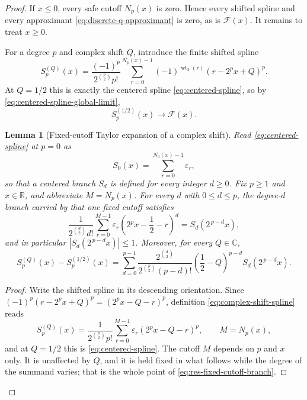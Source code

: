 \documentclass[11pt,oneside]{article}
\newtheorem{lemma}[theorem]{Lemma}
\theoremstyle{definition}
\theoremstyle{remark}
\newcommand{\R}{\mathbb R}
\newcommand{\C}{\mathbb C}
\newcommand{\wt}{\operatorname{wt}_2}
\begin{document}
\begin{proof}
If $x\le0$, every safe cutoff $N_p(x)$ is zero.  Hence every shifted spline and every
approximant \eqref{eq:discrete-q-approximant} is zero, as is $\mathcal F(x)$.  It remains
to treat $x\ge0$.

For a degree $p$ and complex shift $Q$, introduce the finite shifted spline
\begin{equation}
 S_p^{(Q)}(x)=
 \frac{(-1)^p}{2^{\binom p2}p!}
 \sum_{r=0}^{N_p(x)-1}(-1)^{\wt(r)}
 (r-2^px+Q)^p.                                           \label{eq:complex-shift-spline}
\end{equation}
At $Q=1/2$ this is exactly the centered spline
\eqref{eq:centered-spline}, so by \eqref{eq:centered-spline-global-limit},
\begin{equation*}
 S_p^{(1/2)}(x)\longrightarrow\mathcal F(x).
\end{equation*}
\begin{lemma}[Fixed-cutoff Taylor expansion of a complex shift]
\label{lem:res-spline-taylor}
Read \eqref{eq:centered-spline} at $p=0$ as
\begin{equation}
 S_0(x)=\sum_{r=0}^{N_0(x)-1}\varepsilon_r,               \label{eq:res-degree-zero-spline}
\end{equation}
so that a centered branch $S_d$ is defined for every integer $d\ge0$.  Fix $p\ge1$ and
$x\in\R$, and abbreviate $M=N_p(x)$.  For every $d$ with $0\le d\le p$, the degree-$d$ branch
carried by that one fixed cutoff satisfies
\begin{equation}
 \frac1{2^{\binom d2}d!}\sum_{r=0}^{M-1}\varepsilon_r
 \left(2^px-\frac12-r\right)^{d}
 =S_d\!\left(2^{\,p-d}x\right),                           \label{eq:res-fixed-cutoff-branch}
\end{equation}
and in particular $\left|S_d\!\left(2^{\,p-d}x\right)\right|\le1$.  Moreover, for every
$Q\in\C$,
\begin{equation}
 S_p^{(Q)}(x)-S_p^{(1/2)}(x)
 =\sum_{d=0}^{p-1}
 \frac{2^{\binom d2}}{2^{\binom p2}(p-d)!}
 \left(\frac12-Q\right)^{p-d}
 S_d\!\left(2^{\,p-d}x\right).                            \label{eq:res-spline-taylor}
\end{equation}
\end{lemma}

\begin{proof}
Write the shifted spline in its descending orientation.  Since
$(-1)^p(r-2^px+Q)^p=(2^px-Q-r)^p$, definition \eqref{eq:complex-shift-spline} reads
\begin{equation}
 S_p^{(Q)}(x)=\frac1{2^{\binom p2}p!}
 \sum_{r=0}^{M-1}\varepsilon_r\left(2^px-Q-r\right)^{p},
 \qquad M=N_p(x),                                         \label{eq:res-descending-spline}
\end{equation}
and at $Q=1/2$ this is \eqref{eq:centered-spline}.  The cutoff $M$ depends on $p$ and $x$
only.  It is unaffected by $Q$, and it is held fixed in what follows while the degree of the
summand varies; that is the whole point of \eqref{eq:res-fixed-cutoff-branch}.


\end{proof}
\end{proof}
\end{document}
